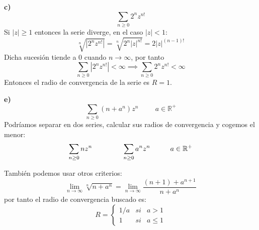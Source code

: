 \begin{sol}
	
	
	\textbf{c)}
	$$\sum_{n\geq 0} 2^nz^{n!}$$
	Si $|z|\geq 1$ entonces la serie diverge, en el caso $|z|<1$:
	$$\sqrt[n]{|2^nz^{n!}|} = \sqrt[n]{2^n|z|^{n!}} = 2|z|^{(n-1)!}$$
	Dicha sucesión tiende a $0$ cuando $n\rightarrow\infty$, por tanto %
	$$\sum_{n\geq 0} |2^nz^{n!}| < \infty \implies \sum_{n\geq 0} 2^nz^{n!} < \infty$$ 
	Entonces el radio de convergencia de la serie es $R=1$.
	
	
	
	\textbf{e)}
	$$\sum_{n\geq 0} (n+a^n)z^n \hspace{1cm} a\in\mathbb{R}^+$$
	Podríamos separar en dos series, calcular sus radios de convergencia y cogemos el menor:
	$$\sum_{n\geq 0} nz^n \hspace{1.5cm}\sum_{n\geq 0} a^nz^n\hspace{1cm} a\in\mathbb{R}^+$$
	
	
	
	También podemos usar otros criterios:
	$$\lim_{n\rightarrow\infty} \sqrt[n]{n+a^n} = \lim_{n\rightarrow\infty} \frac{(n+1)+a^{n+1}}{n+a^n} $$
	por tanto el radio de convergencia buscado es:
	$$ R = \left\{ \begin{array}{lcc}
	1/a &   si  & a>1 \\
	1 &  si & a\leq 1
	\end{array}
	\right. $$
	
	


	
\end{sol}

